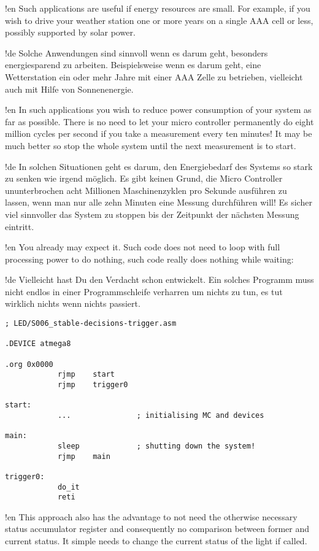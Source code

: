!en Such applications are useful if energy resources are small. For example, if you wish to drive your weather station one or more years on a single AAA cell or less, possibly supported by solar power.

!de Solche Anwendungen sind sinnvoll wenn es darum geht, besonders energiesparend zu arbeiten. Beispielsweise wenn es darum geht, eine Wetterstation ein oder mehr Jahre mit einer AAA Zelle zu betrieben, vielleicht auch mit Hilfe von Sonnenenergie.



!en In such applications you wish to reduce power consumption of your system as far as possible. There is no need to let your micro controller permanently do eight million cycles per second if you take a measurement every ten minutes! It may be much better so stop the whole system until the next measurement is to start.


!de In solchen Situationen geht es darum, den Energiebedarf des Systems so stark zu senken wie irgend möglich. Es gibt keinen Grund, die Micro Controller ununterbrochen acht Millionen Maschinenzyklen pro Sekunde ausführen zu lassen, wenn man nur alle zehn Minuten eine Messung durchführen will! Es sicher viel sinnvoller das System zu stoppen bis der Zeitpunkt der nächsten Messung eintritt.



!en You already may expect it. Such code does not need to loop with full processing power to do nothing, such code really does nothing while waiting:

!de Vielleicht hast Du den Verdacht schon entwickelt. Ein solches Programm muss nicht endlos in einer Programmschleife verharren um nichts zu tun, es tut wirklich nichts wenn nichts passiert.



\begin{lstlisting}
; LED/S006_stable-decisions-trigger.asm

.DEVICE atmega8

.org 0x0000
            rjmp    start
            rjmp    trigger0
            
start:
            ...               ; initialising MC and devices
            
main:
            sleep             ; shutting down the system!
            rjmp    main

trigger0:
            do_it
            reti
\end{lstlisting}

!en This approach also has the advantage to not need the otherwise necessary status accumulator register and consequently no comparison between former and current status. It simple needs to change the current status of the light if called.

